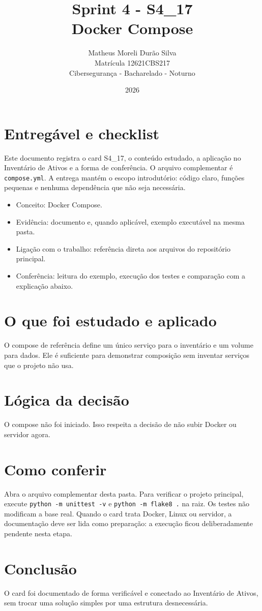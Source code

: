 \documentclass[12pt]{article}
\title{Sprint 4 - S4\_17\\Docker Compose}
\author{Matheus Moreli Durão Silva\\ Matrícula 12621CBS217\\ Cibersegurança - Bacharelado - Noturno}
\date{2026}
\begin{document}
\maketitle

\section*{Entregável e checklist}
Este documento registra o card S4\_17, o conteúdo estudado, a aplicação no Inventário de Ativos e a forma de conferência. O arquivo complementar é \texttt{compose.yml}. A entrega mantém o escopo introdutório: código claro, funções pequenas e nenhuma dependência que não seja necessária.

\begin{itemize}
\item Conceito: Docker Compose.
\item Evidência: documento e, quando aplicável, exemplo executável na mesma pasta.
\item Ligação com o trabalho: referência direta aos arquivos do repositório principal.
\item Conferência: leitura do exemplo, execução dos testes e comparação com a explicação abaixo.
\end{itemize}

\section*{O que foi estudado e aplicado}
O compose de referência define um único serviço para o inventário e um volume para dados. Ele é suficiente para demonstrar composição sem inventar serviços que o projeto não usa.

\section*{Lógica da decisão}
O compose não foi iniciado. Isso respeita a decisão de não subir Docker ou servidor agora.

\section*{Como conferir}
Abra o arquivo complementar desta pasta. Para verificar o projeto principal, execute \texttt{python -m unittest -v} e \texttt{python -m flake8 .} na raiz. Os testes não modificam a base real. Quando o card trata Docker, Linux ou servidor, a documentação deve ser lida como preparação: a execução ficou deliberadamente pendente nesta etapa.

\section*{Conclusão}
O card foi documentado de forma verificável e conectado ao Inventário de Ativos, sem trocar uma solução simples por uma estrutura desnecessária.
\end{document}
